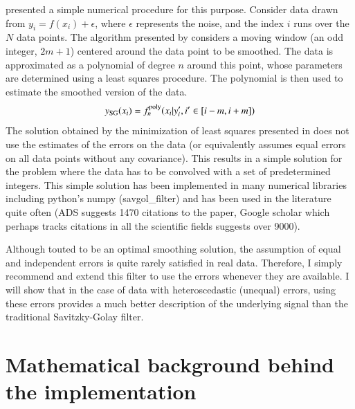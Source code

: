\documentclass[iop, apj, onecolumn]{emulateapj}
\begin{document}
\citet{SG1964} presented a simple numerical procedure for this purpose. Consider
data drawn from $y_i=f(x_i)+\epsilon$, where $\epsilon$ represents the noise,
and the index $i$ runs over the $N$ data points. The algorithm presented by
\citet{SG1964} considers a moving window (an odd integer, $2m+1$) centered
around the data point to be smoothed. The data is approximated as a polynomial
of degree $n$ around this point, whose parameters are determined using a least
squares procedure. The polynomial is then used to estimate the smoothed version
of the data. 
\begin{equation}
        y_{\rm SG}(x_i) = f^{\rm poly}_{n}(x_i|{y_i', i'\in[i-m,i+m]})
\end{equation}
The solution obtained by the minimization of least squares presented in
\citet{SG1964} does not use the estimates of the errors on the data (or
equivalently assumes equal errors on all data points without any covariance).
This results in a simple solution for the problem where the data has to be
convolved with a set of predetermined integers. This simple solution has been
implemented in many numerical libraries including python's numpy
(savgol\_filter) and has been used in the literature quite often (ADS suggests
1470 citations to the paper, Google scholar which perhaps tracks citations in
all the scientific fields suggests over 9000).

Although touted to be an optimal smoothing solution, the assumption of equal and
independent errors is quite rarely satisfied in real data. Therefore, I simply
recommend and extend this filter to use the errors whenever they are available.
I will show that in the case of data with heteroscedastic (unequal) errors,
using these errors provides a much better description of the underlying signal
than the traditional Savitzky-Golay filter.

\section{Mathematical background behind the implementation}
\end{document}
